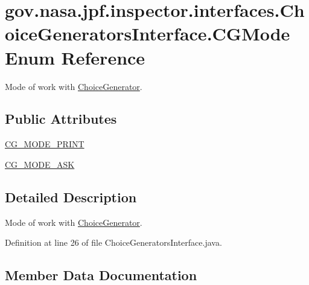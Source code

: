 \hypertarget{enumgov_1_1nasa_1_1jpf_1_1inspector_1_1interfaces_1_1_choice_generators_interface_1_1_c_g_mode}{}\section{gov.\+nasa.\+jpf.\+inspector.\+interfaces.\+Choice\+Generators\+Interface.\+C\+G\+Mode Enum Reference}
\label{enumgov_1_1nasa_1_1jpf_1_1inspector_1_1interfaces_1_1_choice_generators_interface_1_1_c_g_mode}


Mode of work with \hyperlink{}{Choice\+Generator}.  


\subsection*{Public Attributes}
\begin{DoxyCompactItemize}
\item 
\hyperlink{enumgov_1_1nasa_1_1jpf_1_1inspector_1_1interfaces_1_1_choice_generators_interface_1_1_c_g_mode_aa57768ae6f1c100e6b2acbf7abe3aa7d}{C\+G\+\_\+\+M\+O\+D\+E\+\_\+\+P\+R\+I\+NT}
\item 
\hyperlink{enumgov_1_1nasa_1_1jpf_1_1inspector_1_1interfaces_1_1_choice_generators_interface_1_1_c_g_mode_aa81956eaa60ff2722dbaa12f1a1b89bd}{C\+G\+\_\+\+M\+O\+D\+E\+\_\+\+A\+SK}
\end{DoxyCompactItemize}


\subsection{Detailed Description}
Mode of work with \hyperlink{}{Choice\+Generator}. 

Definition at line 26 of file Choice\+Generators\+Interface.\+java.



\subsection{Member Data Documentation}
